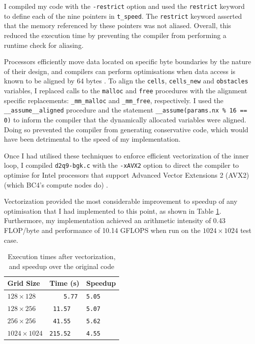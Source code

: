 \documentclass[twocolumn, a4paper]{article}
\begin{document}
I compiled my code with the \texttt{-restrict} option and used the \texttt{restrict} keyword to define each of the nine pointers in \texttt{t\_speed}.
The \texttt{restrict} keyword asserted that the memory referenced by these pointers was not aliased.
Overall, this reduced the execution time by preventing the compiler from performing a runtime check for aliasing.

Processors efficiently move data located on specific byte boundaries by the nature of their design, and compilers can perform optimisations when data access is known to be aligned by 64 bytes \cite{alignment}.
To align the \texttt{cells}, \texttt{cells\_new} and \texttt{obstacles} variables, I replaced calls to the \texttt{malloc} and \texttt{free} procedures with the alignment specific replacements: \texttt{\_mm\_malloc} and \texttt{\_mm\_free}, respectively.
I used the \texttt{\_\_assume\_\_aligned} procedure and  the statement \texttt{\_\_assume(params.nx \% 16 == 0)} to inform the compiler that the dynamically allocated variables were aligned.
Doing so prevented the compiler from generating conservative code, which would have been detrimental to the speed of my implementation.

Once I had utilised these techniques to enforce efficient vectorization of the inner loop, I compiled \texttt{d2q9-bgk.c} with the \texttt{-xAVX2} option to direct the compiler to optimise for Intel processors that support Advanced Vector Extensions 2 (AVX2) (which BC4's compute nodes do) \cite{lenovo}.

Vectorization provided the most considerable improvement to speedup of any optimisation that I had implemented to this point, as shown in Table \ref{tab:vectorized}.
Furthermore, my implementation achieved an arithmetic intensity of 0.43 FLOP/byte and performance of 10.14 GFLOPS when run on the $1024\times1024$ test case.

\begin{table}[htbp]
  \begin{center}
  \caption{Execution times after vectorization, and speedup over the original code}\label{tab:vectorized}
  \begin{tabular}{l | l l} 
      \hline\hline
      Grid Size&Time (s)&Speedup\\
      \hline
      $128 \times 128$&\texttt{  \,\,\,5.77}&\texttt{5.05}\\
      $128 \times 256$&\texttt{ 11.57}&\texttt{5.07}\\
      $256 \times 256$&\texttt{ 41.55}&\texttt{5.62}\\
      $1024 \times 1024$&\texttt{215.52}&\texttt{4.55}\\
      \hline
    \end{tabular}
  \end{center}
\end{table}
\end{document}
